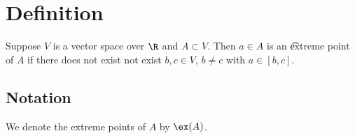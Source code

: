 

\section*{Definition}

Suppose $V$ is a vector space over $\R $ and $A \subset V$.
Then $a \in A$ is an \t{extreme point} of $A$ if there does not exist not exist $b, c \in V$, $b \neq c$ with $a \in [b, c]$.


\subsection*{Notation}

We denote the extreme points of $A$ by $\ex(A)$.

\blankpage
\blankpage